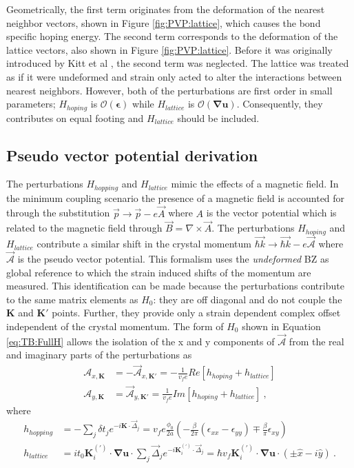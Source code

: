 Geometrically, the first term originates from the deformation of the nearest neighbor vectors, shown in Figure \ref{fig:PVP:lattice}, which causes the bond specific hoping energy.
The second term corresponds to the deformation of the lattice vectors, also shown in Figure \ref{fig:PVP:lattice}.
Before it was originally introduced by Kitt et al \cite{Kitt2012}, the second term was neglected.
The lattice was treated as if it were undeformed and strain only acted to alter the interactions between nearest neighbors.
However, both of the perturbations are first order in small parameters; $H_{hoping}$ is $\mathcal{O}(\bm{\epsilon})$ while $H_{lattice}$ is $\mathcal{O}(\bm{\nabla u})$.
Consequently, they contributes on equal footing and $H_{lattice}$ should be included.

\subsection{Pseudo vector potential derivation}
The perturbations $H_{hopping}$ and $H_{lattice}$ mimic the effects of a magnetic field.
In the minimum coupling scenario the presence of a magnetic field is accounted for through the substitution $\vec{p} \rightarrow \vec{p} - e \vec{A}$ where $A$ is the vector potential which is related to the magnetic field through $\vec{B}=\nabla \times \vec{A}$.
The perturbations $H_{hoping}$ and $H_{lattice}$ contribute a similar shift in the crystal momentum $\vec{\hbar k} \rightarrow \vec{\hbar k} - e \vec{\mathcal{A}}$ where $\vec{\mathcal{A}}$ is the pseudo vector potential.
This formalism uses the \emph{undeformed} BZ as global reference to which the strain induced shifts of the momentum are measured.
This identification can be made because the perturbations contribute to the same matrix elements as $H_0$: they are off diagonal and do not couple the $\bm{K}$ and $\bm{K'}$ points.
Further, they provide only a strain dependent complex offset independent of the crystal momentum.
The form of $H_0$ shown in Equation \ref{eq:TB:FullH} allows the isolation of the x and y components of $\vec{\mathcal{A}}$ from the real and imaginary parts of the perturbations as
\begin{align}
  \mathcal{A}_{x,\bm{K}}&=-\vec{\mathcal{A}}_{x,\bm{K'}}=-\frac{1}{v_f e} Re[h_{hoping}+h_{lattice}] \nonumber \\
  \mathcal{A}_{y,\bm{K}}&=\vec{\mathcal{A}}_{y,\bm{K'}}= \frac{1}{v_f e} Im[h_{hoping}+h_{lattice}] \label{eq:PVP:AfromH}\ ,
\end{align}
where 
\begin{align}
  h_{hopping}&=-\sum_{j} \delta t_j e^{-i \bm{K} \cdot \vec{\Delta}_j}=
    v_f e \frac{\phi_0}{2a} \left(- \frac{\beta}{2 \pi} (\epsilon_{xx}-\epsilon_{yy})
    \mp \frac{\beta}{\pi} \epsilon_{xy} \right) \nonumber \\
  h_{lattice}&=i t_0  \bm{K}_i^{(')} \cdot \bm{\nabla u} \cdot \sum_{j} \vec{\Delta}_j e^{-i \bm{K}_i^{(')} \cdot \vec{\Delta}_j}
    =\hbar v_f \bm{K}_i^{(')}\cdot \bm{\nabla u} \cdot \left( \pm \hat{x}-i \hat{y}\right)  \label{eq:PVP:nocurl} \ .
\end{align}

